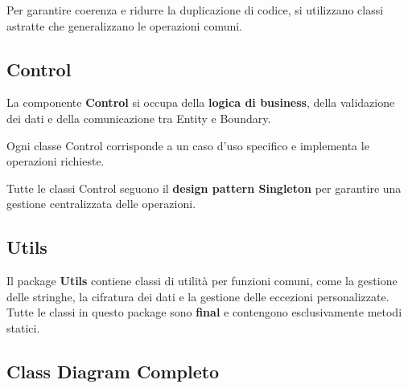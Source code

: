 Per garantire coerenza e ridurre la duplicazione di codice, si utilizzano classi astratte che generalizzano le operazioni comuni.


\subsection{Control}

La componente \textbf{Control} si occupa della \textbf{logica di business}, della validazione dei dati e della comunicazione tra Entity e Boundary.

Ogni classe Control corrisponde a un caso d'uso specifico e implementa le operazioni richieste.

Tutte le classi Control seguono il \textbf{design pattern Singleton} per garantire una gestione centralizzata delle operazioni.


\subsection{Utils}

Il package \textbf{Utils} contiene classi di utilità per funzioni comuni, come la gestione delle stringhe, la cifratura dei dati e la gestione delle eccezioni personalizzate. Tutte le classi in questo package sono \textbf{final} e contengono esclusivamente metodi statici.


\subsection{Class Diagram Completo}

